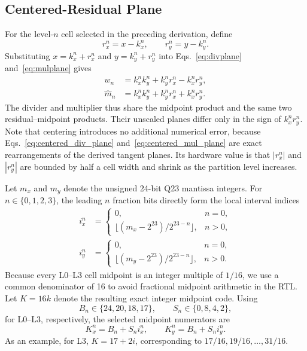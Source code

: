 \documentclass[conference]{IEEEtran}
\begin{document}
\subsection{Centered-Residual Plane}
For the level-$n$ cell selected in the preceding derivation, define
\begin{equation}
 r_x^n=x-k_x^n,\qquad r_y^n=y-k_y^n.
 \label{eq:centered_residuals}
\end{equation}
Substituting $x=k_x^n+r_x^n$ and $y=k_y^n+r_y^n$ into
Eqs.~\eqref{eq:divplane} and~\eqref{eq:mulplane} gives
\begin{align}
 w_n &= k_x^nk_y^n+k_y^nr_x^n-k_x^nr_y^n,
 \label{eq:centered_div_plane}\\
 \widehat{m}_n &= k_x^nk_y^n+k_y^nr_x^n+k_x^nr_y^n.
 \label{eq:centered_mul_plane}
\end{align}
The divider and multiplier thus share the midpoint product and the same two
residual--midpoint products. Their unscaled planes differ only in the sign of
$k_x^nr_y^n$. Note that centering introduces no additional numerical error, because Eqs.~\eqref{eq:centered_div_plane}
and~\eqref{eq:centered_mul_plane} are exact rearrangements of the derived
tangent planes. Its hardware value is that $|r_x^n|$ and $|r_y^n|$ are bounded
by half a cell width and shrink as the partition level increases.

Let $m_x$ and $m_y$ denote the unsigned 24-bit Q23 mantissa integers. For
$n\in\{0,1,2,3\}$, the leading $n$ fraction bits directly form the local
interval indices
\begin{equation}
 \begin{aligned}
 i_x^n &=
 \begin{cases}
  0, & n=0,\\
  \lfloor(m_x-2^{23})/2^{23-n}\rfloor, & n>0,
 \end{cases}\\[4pt]
 i_y^n &=
 \begin{cases}
  0, & n=0,\\
  \lfloor(m_y-2^{23})/2^{23-n}\rfloor, & n>0.
 \end{cases}
 \end{aligned}
\end{equation}
Because every L0--L3 cell midpoint is an integer multiple of $1/16$, we use
a common denominator of 16 to avoid fractional midpoint arithmetic in the RTL. Let $K=16k$ denote the resulting exact integer midpoint code. Using
\begin{equation}
 B_n\in\{24,20,18,17\},\qquad S_n\in\{0,8,4,2\},
\end{equation}
for L0--L3, respectively, the selected midpoint numerators are
\begin{equation}
 K_x^n=B_n+S_ni_x^n,\qquad K_y^n=B_n+S_ni_y^n.
\end{equation}
As an example, for L3, $K=17+2i$, corresponding to
$17/16,19/16,\ldots,31/16$.
\end{document}
